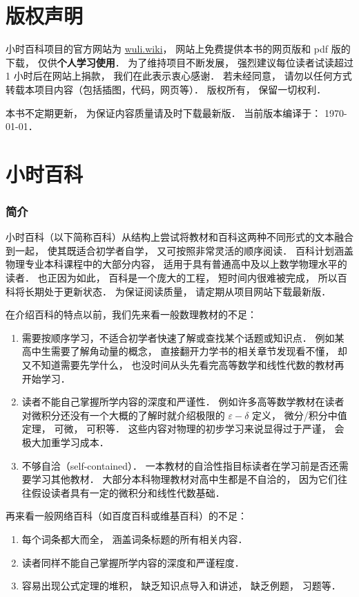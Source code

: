 
\chapter*{版权声明}

小时百科项目的官方网站为 \href{https://wuli.wiki}{wuli.wiki}， 网站上免费提供本书的网页版和 pdf 版的下载， 仅供\textbf{个人学习使用}． 为了维持项目不断发展， 强烈建议每位读者试读超过 1 小时后在网站上捐款， 我们在此表示衷心感谢． 若未经同意， 请勿以任何方式转载本项目内容（包括插图，代码，网页等）． 版权所有， 保留一切权利．

本书不定期更新， 为保证内容质量请及时下载最新版． 当前版本编译于： \today．

\chapter*{小时百科}

\subsection{简介}

小时百科（以下简称百科）从结构上尝试将教材和百科这两种不同形式的文本融合到一起， 使其既适合初学者自学， 又可按照非常灵活的顺序阅读． 百科计划涵盖物理专业本科课程中的大部分内容， 适用于具有普通高中及以上数学物理水平的读者． 也正因为如此， 百科是一个庞大的工程， 短时间内很难被完成， 所以百科将长期处于更新状态． 为保证阅读质量， 请定期从项目网站下载最新版．

在介绍百科的特点以前，我们先来看一般数理教材的不足：
\begin{enumerate}
\item 需要按顺序学习，不适合初学者快速了解或查找某个话题或知识点． 例如某高中生需要了解角动量的概念， 直接翻开力学书的相关章节发现看不懂， 却又不知道需要先学什么， 也没时间从头先看完高等数学和线性代数的教材再开始学习．
\item 读者不能自己掌握所学内容的深度和严谨性． 例如许多高等数学教材在读者对微积分还没有一个大概的了解时就介绍极限的 $\varepsilon-\delta$ 定义， 微分/积分中值定理， 可微， 可积等． 这些内容对物理的初步学习来说显得过于严谨， 会极大加重学习成本．
\item 不够自洽（self-contained）． 一本教材的自洽性指目标读者在学习前是否还需要学习其他教材． 大部分本科物理教材对高中生都是不自洽的， 因为它们往往假设读者具有一定的微积分和线性代数基础．
\end{enumerate}

再来看一般网络百科（如百度百科或维基百科）的不足：
\begin{enumerate}
\item 每个词条都大而全， 涵盖词条标题的所有相关内容．
\item 读者同样不能自己掌握所学内容的深度和严谨程度．
\item 容易出现公式定理的堆积， 缺乏知识点导入和讲述， 缺乏例题， 习题等．
\end{enumerate}

